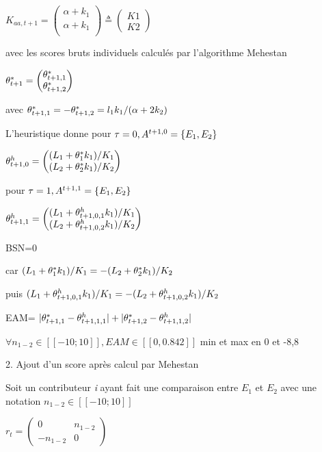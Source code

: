 $K_{aa,t+1}= \begin{pmatrix}
\alpha + k_1\\
\alpha +  k_1\\
\end{pmatrix} \triangleq
\begin{pmatrix}
K1\\
K2
\end{pmatrix} 
$

avec les scores bruts individuels calculés par l'algorithme Mehestan

$\theta^*_{t+1}= \begin{pmatrix}
\theta^*_{t+1,1} \\
\theta^*_{t+1,2} 
\end{pmatrix}$

avec $\theta^*_{t+1,1}  = -\theta^*_{t+1,2} = l_1 k_1/(\alpha+2 k_2)$

L'heuristique donne pour $\tau=0, A^{t+1,0}=\left\lbrace E_1,E_2 \right\rbrace$

$ \theta^h_{t+1,0}= \begin{pmatrix}
(L_1+\theta^*_{1} k_1) / K_1 \\
(L_2+\theta^*_{2} k_1) / K_2
\end{pmatrix}$

pour $\tau=1, A^{t+1,1}=\left\lbrace E_1,E_2 \right\rbrace$

$ \theta^h_{t+1,1}= \begin{pmatrix}
(L_1+\theta^h_{t+1,0,1} k_1) / K_1 \\
(L_2+\theta^h_{t+1,0,2} k_1) / K_2
\end{pmatrix}$


BSN=0

car  $(L_1+\theta^*_{1} k_1) / K_1 =
-(L_2+\theta^*_{2} k_1) / K_2$

puis 
$(L_1+\theta^h_{t+1,0,1} k_1) / K_1 =
-(L_2+\theta^h_{t+1,0,2} k_1) / K_2 $

EAM=  $|\theta^*_{t+1,1} - \theta^h_{t+1,1,1}|   +  |\theta^*_{t+1,2} - \theta^h_{t+1,1,2}| $

$\forall{n_{1-2}}\in [\![-10;10]\!], EAM \in [\![0,0.842]\!]$ 
min et max en 0 et {-8,8}



2. Ajout d'un score après calcul par Mehestan

Soit un contributeur \textit{i} ayant fait une comparaison entre $E_{1}$ et $E_{2}$ avec une notation $n_{1-2} \in [\![-10;10]\!]$


$r_{t}= \begin{pmatrix}
0 & n_{1-2} \\
-n_{1-2} & 0 
\end{pmatrix}$

